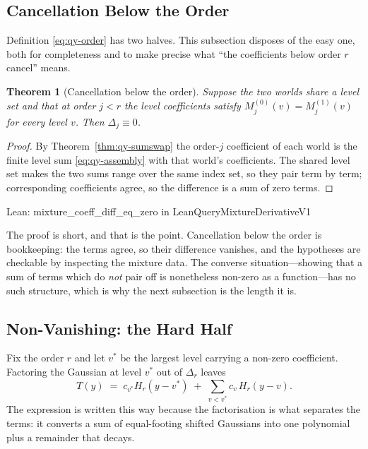 \documentclass[conference]{IEEEtran}
\newtheorem{theorem}{Theorem}
\theoremstyle{definition}
\newcommand{\lean}[1]{\textsf{\footnotesize #1}}
\newcommand{\leanbox}[1]{%
  \par\vspace{2pt}\noindent
  {\footnotesize\textsf{Lean: #1}}\par\vspace{2pt}}
\begin{document}
\subsection{Cancellation Below the Order}
\label{sec:qy-cancel}

Definition \eqref{eq:qy-order} has two halves. This subsection disposes of the easy one, both
for completeness and to make precise what ``the coefficients below order $r$ cancel'' means.

\begin{theorem}[Cancellation below the order]
\label{thm:qy-cancel}
Suppose the two worlds share a level set and that at order $j<r$ the level coefficients
satisfy $M^{(0)}_{j}(v)=M^{(1)}_{j}(v)$ for every level $v$. Then $\Delta_{j}\equiv0$.
\end{theorem}

\begin{proof}
By Theorem~\ref{thm:qy-sumswap} the order-$j$ coefficient of each world is the finite level sum
\eqref{eq:qy-assembly} with that world's coefficients. The shared level set makes the two sums
range over the same index set, so they pair term by term; corresponding coefficients agree,
so the difference is a sum of zero terms.
\end{proof}

\leanbox{\lean{mixture\_coeff\_diff\_eq\_zero} in \lean{LeanQueryMixtureDerivativeV1}}

The proof is short, and that is the point. Cancellation below the order is bookkeeping: the
terms agree, so their difference vanishes, and the hypotheses are checkable by inspecting
the mixture data. The converse situation---showing that a sum of terms which do \emph{not}
pair off is nonetheless non-zero as a function---has no such structure, which is why the next
subsection is the length it is.

\subsection{Non-Vanishing: the Hard Half}
\label{sec:qy-nonvanish}

Fix the order $r$ and let $v^{*}$ be the largest level carrying a non-zero coefficient.
Factoring the Gaussian at level $v^{*}$ out of $\Delta_{r}$ leaves
\begin{equation}
T(y)\;=\;c_{v^{*}}H_{r}(y-v^{*})\;+\;\sum_{v<v^{*}}c_{v}\,H_{r}(y-v).
\label{eq:qy-nonvanish}
\end{equation}
The expression is written this way because the factorisation is what separates the terms: it
converts a sum of equal-footing shifted Gaussians into one polynomial plus a remainder that
decays.
\end{document}
